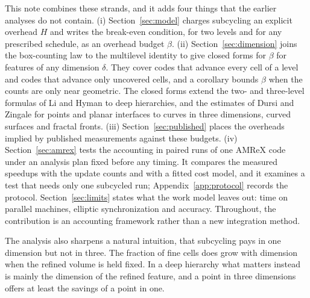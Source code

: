 \documentclass[12pt]{article}
\theoremstyle{remark}
\begin{document}
This note combines these strands, and it adds four things that the earlier analyses do not contain. (i) Section~\ref{sec:model} charges subcycling an explicit overhead $H$ and writes the break-even condition, for two levels and for any prescribed schedule, as an overhead budget $\beta$. (ii) Section~\ref{sec:dimension} joins the box-counting law to the multilevel identity to give closed forms for $\beta$ for features of any dimension $\delta$. They cover codes that advance every cell of a level and codes that advance only uncovered cells, and a corollary bounds $\beta$ when the counts are only near geometric. The closed forms extend the two- and three-level formulas of Li and Hyman to deep hierarchies, and the estimates of Dursi and Zingale for points and planar interfaces to curves in three dimensions, curved surfaces and fractal fronts. (iii) Section~\ref{sec:published} places the overheads implied by published measurements against these budgets. (iv) Section~\ref{sec:amrex} tests the accounting in paired runs of one AMReX code under an analysis plan fixed before any timing. It compares the measured speedups with the update counts and with a fitted cost model, and it examines a test that needs only one subcycled run; Appendix~\ref{app:protocol} records the protocol. Section~\ref{sec:limits} states what the work model leaves out: time on parallel machines, elliptic synchronization and accuracy. Throughout, the contribution is an accounting framework rather than a new integration method.

The analysis also sharpens a natural intuition, that subcycling pays in one dimension but not in three. The fraction of fine cells does grow with dimension when the refined volume is held fixed. In a deep hierarchy what matters instead is mainly the dimension of the refined feature, and a point in three dimensions offers at least the savings of a point in one.
\end{document}
